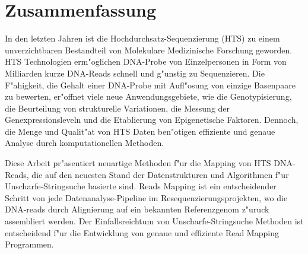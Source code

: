 \section*{Zusammenfassung}
\label{sec:abstract:de}


In den letzten Jahren ist die Hochdurchsatz-Sequenzierung (HTS) zu einem unverzichtbaren Bestandteil von Molekulare Medizinische Forschung geworden. 
HTS Technologien erm"oglichen DNA-Probe von Einzelpersonen in Form von Milliarden kurze DNA-Reads schnell und g"unstig zu Sequenzieren.
Die F"ahigkeit, die Gehalt einer DNA-Probe mit Aufl"osung von einzige Basenpaare zu bewerten, er"offnet viele neue Anwendungsgebiete, wie die Genotypisierung, die Beurteilung von strukturelle Variationen, die Messung der Genexpressionsleveln und die Etablierung von Epigenetische Faktoren.
Dennoch, die Menge und Qualit"at von HTS Daten ben"otigen effiziente und genaue Analyse durch komputationellen Methoden.

Diese Arbeit pr"asentiert neuartige Methoden f"ur die Mapping von HTS DNA-Reads, die auf den neuesten Stand der Datenstrukturen und Algorithmen f"ur Unscharfe-Stringsuche basierte sind.
Reads Mapping ist ein entscheidender Schritt von jede Datenanalyse-Pipeline im Resequenzierungsprojekten, wo die DNA-reads durch Alignierung auf ein bekannten Referenzgenom z"uruck assembliert werden.
Der Einfallsreichtum von Unscharfe-Stringsuche Methoden ist entscheidend f"ur die Entwicklung von genaue und effiziente Read Mapping Programmen.

